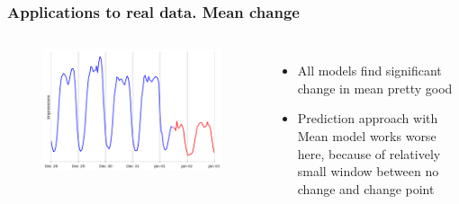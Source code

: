 \documentclass[intlimits, 9pt, unicode]{beamer}
\begin{document}
\begin{frame}
    \frametitle{Applications to real data. Mean change}
  \begin{columns}[T,onlytextwidth]
\begin{figure}
\includegraphics[scale=0.2]{images/methods_comparison_2}
\end{figure}
	    \begin{itemize}
	    	\item All models find significant change in mean pretty good
		\item Prediction approach with Mean model works worse here, because of relatively small window between no change and change point
	    \end{itemize}
     \end{columns}
\end{frame}
\end{document}
